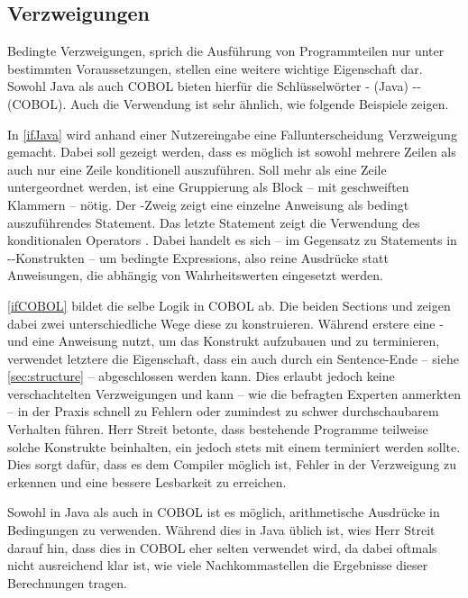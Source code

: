 \subsection{Verzweigungen}
Bedingte Verzweigungen, sprich die Ausführung von Programmteilen nur unter bestimmten Voraussetzungen, stellen eine weitere wichtige Eigenschaft dar. Sowohl Java als auch COBOL bieten hierfür die Schlüsselwörter - (Java) \bzw {}-- (COBOL). Auch die Verwendung ist sehr ähnlich, wie folgende Beispiele zeigen.


In \autoref{ifJava} wird anhand einer Nutzereingabe eine Fallunterscheidung \bzw Verzweigung gemacht. Dabei soll gezeigt werden, dass es möglich ist sowohl mehrere Zeilen als auch nur eine Zeile konditionell auszuführen. Soll mehr als eine Zeile untergeordnet werden, ist eine Gruppierung als Block -- mit geschweiften Klammern -- nötig. Der -Zweig zeigt eine einzelne Anweisung als bedingt auszuführendes Statement. Das letzte Statement zeigt die Verwendung des konditionalen Operators . Dabei handelt es sich -- im Gegensatz zu Statements in --Konstrukten -- um bedingte Expressions, also reine Ausdrücke statt Anweisungen, die abhängig von Wahrheitswerten eingesetzt werden.

\autoref{ifCOBOL} bildet die selbe Logik in COBOL ab. Die beiden Sections  und  zeigen dabei zwei unterschiedliche Wege diese zu konstruieren. Während erstere eine - und eine  Anweisung nutzt, um das Konstrukt aufzubauen und zu terminieren, verwendet letztere die Eigenschaft, dass ein  auch durch ein Sentence-Ende -- siehe \autoref{sec:structure} -- abgeschlossen werden kann. Dies erlaubt jedoch keine verschachtelten Verzweigungen und kann -- wie die befragten Experten anmerkten -- in der Praxis schnell zu Fehlern oder zumindest zu schwer durchschaubarem Verhalten führen. Herr Streit betonte, dass bestehende Programme teilweise solche Konstrukte beinhalten, ein  jedoch stets mit einem  terminiert werden sollte. Dies sorgt dafür, dass es dem Compiler möglich ist, Fehler in der Verzweigung zu erkennen und eine bessere Lesbarkeit zu erreichen.


Sowohl in Java als auch in COBOL ist es möglich, arithmetische Ausdrücke in Bedingungen zu verwenden. Während dies in Java üblich ist, wies Herr Streit darauf hin, dass dies in COBOL eher selten verwendet wird, da dabei oftmals nicht ausreichend klar ist, wie viele Nachkommastellen die Ergebnisse dieser Berechnungen tragen.